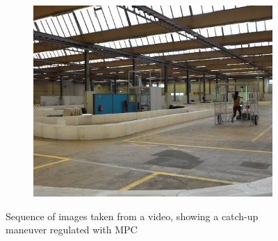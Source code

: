\documentclass[a4paper,12pt,oneside]{book}
\begin{document}
\begin{figure} [h!]
\begin{subfigure}[b]{0.32\textwidth}
        \includegraphics[width=\textwidth]{Catch/Catch9.png}
    \end{subfigure}
    \caption{Sequence of images taken from a video, showing a catch-up maneuver regulated with MPC }
\label{MPC_hard_img1}
\end{figure}
\end{document}
